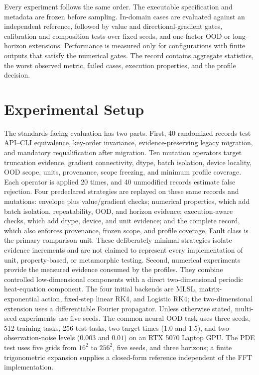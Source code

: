 \documentclass[preprint,12pt]{elsarticle}
\newcommand{\mlsl}{\textnormal{MLSL}}
\begin{document}
Every experiment follows the same order. The executable specification and metadata are frozen before sampling. In-domain cases are evaluated against an independent reference, followed by value and directional-gradient gates, calibration and composition tests over fixed seeds, and one-factor OOD or long-horizon extensions. Performance is measured only for configurations with finite outputs that satisfy the numerical gates. The record contains aggregate statistics, the worst observed metric, failed cases, execution properties, and the profile decision.

\section{Experimental Setup}
The standards-facing evaluation has two parts. First, 40 randomized records test API--CLI equivalence, key-order invariance, evidence-preserving legacy migration, and mandatory requalification after migration. Ten mutation operators target truncation evidence, gradient connectivity, dtype, batch isolation, device locality, OOD scope, units, provenance, scope freezing, and minimum profile coverage. Each operator is applied 20 times, and 40 unmodified records estimate false rejection. Four predeclared strategies are replayed on these same records and mutations: envelope plus value/gradient checks; numerical properties, which add batch isolation, repeatability, OOD, and horizon evidence; execution-aware checks, which add dtype, device, and unit evidence; and the complete record, which also enforces provenance, frozen scope, and profile coverage. Fault class is the primary comparison unit. These deliberately minimal strategies isolate evidence increments and are not claimed to represent every implementation of unit, property-based, or metamorphic testing. Second, numerical experiments provide the measured evidence consumed by the profiles. They combine controlled low-dimensional components with a direct two-dimensional periodic heat-equation component. The four initial backends are \mlsl{}, matrix-exponential action, fixed-step linear RK4, and Logistic RK4; the two-dimensional extension uses a differentiable Fourier propagator. Unless otherwise stated, multi-seed experiments use five seeds. The common neural OOD task uses three seeds, 512 training tasks, 256 test tasks, two target times ($1.0$ and $1.5$), and two observation-noise levels ($0.003$ and $0.01$) on an RTX 5070 Laptop GPU. The PDE test uses five grids from $16^2$ to $256^2$, five seeds, and three horizons; a finite trigonometric expansion supplies a closed-form reference independent of the FFT implementation.
\end{document}

